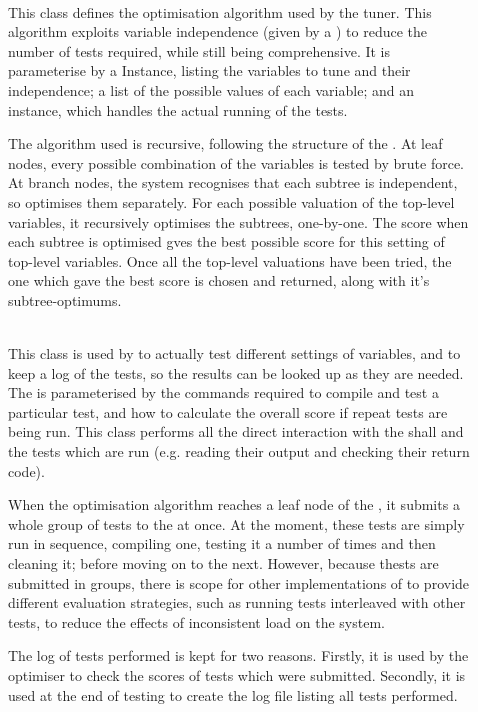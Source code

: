 \documentclass[a4paper, draft]{article}
\begin{document}
\begin{description}
    \item[] \hfill\\
        This class defines the optimisation algorithm used by the tuner. 
        This algorithm exploits variable independence (given by a 
        ) to reduce the number of tests required, while still 
        being comprehensive. It is parameterise by a  Instance, 
        listing the variables to tune and their independence; a list of the 
        possible values of each variable; and an  instance, 
        which handles the actual running of the tests.
        
        The algorithm used is recursive, following the structure of the 
        . At leaf nodes, every possible combination of the 
        variables is tested by brute force. At branch nodes, the system 
        recognises that each subtree is independent, so optimises them 
        separately. For each possible valuation of the top-level variables, 
        it recursively optimises the subtrees, one-by-one. The score when each 
        subtree is optimised gves the best possible score for this setting of 
        top-level variables. Once all the top-level valuations have been tried, 
        the one which gave the best score is chosen and returned, along with 
        it's subtree-optimums.
        
        
        
    \item[] \hfill\\
        This class is used by  to actually test different 
        settings of variables, and to keep a log of the tests, so the results 
        can be looked up as they are needed. The  is 
        parameterised by the commands required to compile and test a 
        particular test, and how to calculate the overall score if repeat 
        tests are being run. This class performs all the direct interaction 
        with the shall and the tests which are run (e.g. reading their output 
        and checking their return code).
        
        When the optimisation algorithm reaches a leaf node of the 
        , it submits a whole group of tests to the 
         at once. At the moment, these tests are simply run 
        in sequence, compiling one, testing it a number of times and then 
        cleaning it; before moving on to the next. However, because thests are 
        submitted in groups, there is scope for other implementations of 
         to provide different evaluation strategies, such as 
        running tests interleaved with other tests, to reduce the effects of 
        inconsistent load on the system.
        
        The log of tests performed is kept for two reasons. Firstly, it is 
        used by the optimiser to check the scores of tests which were 
        submitted. Secondly, it is used at the end of testing to create the 
         log file listing all tests performed.
        
    
\end{description}
\end{document}
